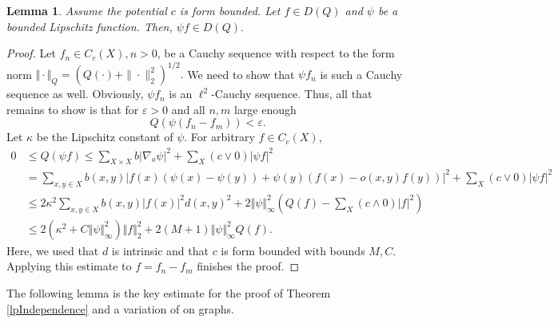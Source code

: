 \documentclass[10pt]{amsart}
\newtheorem{lemma}[theorem]{Lemma}
\theoremstyle{definition}
\begin{document}






\begin{lemma}\label{Q0} Assume the potential $c$ is form bounded.
    Let $ f\in D(Q)$ and $\psi$ be a bounded Lipschitz function. Then, $\psi f\in D(Q).$ 
\end{lemma}

\begin{proof}
    Let $ f_n\in C_c(X),n>0$, be a Cauchy sequence with respect to the form norm $\Vert\cdot\Vert_{{Q}}=(Q(\cdot)+\|\cdot\|^2_2)^{1/2}.$ We need to show that $\psi f_n$ is such a Cauchy sequence as well. Obviously, $\psi f_n$ is an $\ell^2$-Cauchy sequence. Thus, all that remains to show is that for $\varepsilon>0$ and all $n,m$ large enough \[Q(\psi( f_n- f_m))<\varepsilon.\]
Let  $\kappa$ be the Lipschitz constant of $\psi$. For arbitrary $ f\in C_c(X)$,
\begin{align*}
   0 &\leq Q(\psi f) \leq \sum_{X\times X}b\vert\nabla_o\psi\vert^2 +\sum_ X (c\vee0)\vert\psi f\vert^2\\
    &= \sum_{x,y\in X}b(x,y)\vert f(x)(\psi(x)-\psi(y))+\psi(y)( f(x)-o(x,y) f(y))\vert^2+\sum_ X(c\vee 0)\vert\psi f\vert^2\\&\leq 2\kappa^2\sum_{x,y\in X}b(x,y)\vert f(x)\vert^2d(x,y)^2+2\Vert\psi\Vert^2_\infty\left(Q( f)-\sum_ X (c\wedge 0)\vert f\vert^2\right)\\&\leq 2(\kappa^2+C\Vert\psi\Vert^2_\infty)\Vert f\Vert_2^2+2 (M+1)\Vert\psi\Vert^2_\infty Q( f).
\end{align*}
Here, we used that $d$ is intrinsic and that $c$ is form bounded with bounds $M,C$. Applying this estimate to $ f= f_n- f_m$ finishes the proof.
\end{proof}

The following lemma is the key estimate for the proof of Theorem \ref{lpIndependence} and a variation of \cite[Lemma 4.1]{BauerHuaKeller} on graphs.
\end{document}
